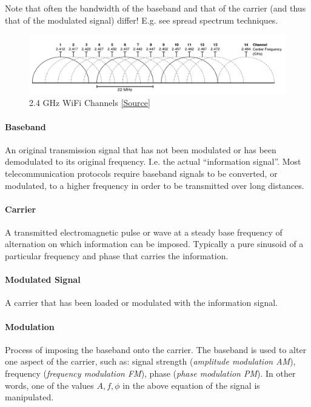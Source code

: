 Note that often the bandwidth of the baseband and that of the carrier (and thus that of the modulated signal) differ!
E.g. see spread spectrum techniques.

\begin{figure}%
	\centering
	\includegraphics[scale=0.35]{images/1-wifi-channels.png}
	\caption{2.4 GHz WiFi Channels \href{https://en.wikipedia.org/wiki/List\_of\_WLAN\_channels\#/media/File:2.4\_GHz\_Wi-Fi\_channels\_(802.11b,g_WLAN).svg}{[Source]}}
	\label{fig:wifi-channels}
\end{figure}

\paragraph{Baseband}
An original transmission signal that has not been modulated or has been demodulated to its original frequency.
I.e. the actual ``information signal''.
Most telecommunication protocols require baseband signals to be converted, or modulated, to a higher frequency in order to be transmitted over long distances.

\paragraph{Carrier}
A transmitted electromagnetic pulse or wave at a steady base frequency of alternation on which information can be imposed.
Typically a pure sinusoid of a particular frequency and phase that carries the information.

\paragraph{Modulated Signal}
A carrier that has been loaded or modulated with the information signal.

\paragraph{Modulation}
Process of imposing the baseband onto the carrier.
The baseband is used to alter one aspect of the carrier, such as:
signal strength (\textit{amplitude modulation AM}), frequency (\textit{frequency modulation FM}), phase (\textit{phase modulation PM}).
In other words, one of the values $A, f, \phi$ in the above equation of the signal is manipulated.

